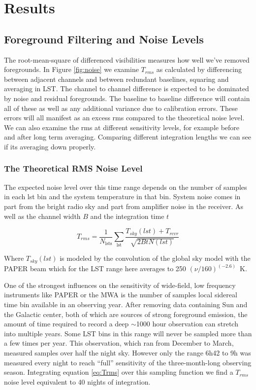 \documentclass[preprint2]{aastex}
\begin{document}
\section{Results}
\label{sec:results}
\subsection{Foreground Filtering and Noise Levels}
\label{sec:noise}
The root-mean-square of differenced visibilities measures how well we've removed foregrounds.  In Figure \ref{fig:noise} we examine $T_{rms}$ as calculated by differencing between adjacent channels and between redundant baselines, squaring and averaging in LST.  The channel to channel difference is expected to be dominated by noise and residual foregrounds. The baseline to baseline difference will contain all of these as well as any additional variance due to calibration errors.  These errors will all manifest as an excess rms compared to the theoretical noise level. We can also examine the rms at different sensitivity levels, for example before and after long term averaging. Comparing different integration lengths we can see if its averaging down properly.




\subsubsection{The Theoretical RMS Noise Level}

The expected noise level over this time range depends on the number of samples in each lst bin and the system temperature in that bin. System noise comes in part from the bright radio sky and part from amplifier noise in the receiver. As well as the channel width $B$ and the integration time $t$

\begin{equation}
T_{rms}  =\frac{1}{N_{\textrm{lsts}}}\sum_{\textrm{lst}} \frac{T_{sky}(lst) + T_{rcvr}}{\sqrt{2BtN(lst)}} 
\label{eq:Trms}
\end{equation}

Where $T_{sky}(lst)$ is modeled by the convolution of the global sky model \citep{deOliveiraCosta:2008p2242} with the PAPER beam \citep{Pober:2012p8800} which for the LST range here averages to 250 $(\nu/160)^(-2.6)$~K.



One of the strongest influences on the sensitivity of wide-field, low frequency instruments like PAPER or the MWA is the number of samples local sidereal time bin available in an observing year.   After removing data containing Sun and the Galactic center, both of which are sources of strong foreground emission, the amount of time required to record a deep $\sim$1000 hour observation can stretch into multiple years.  Some LST bins in this range will never be sampled more than a few times per year.  This observation, which ran from December to March, measured samples over half the night sky. However only the range 6h42 to 9h was measured every night to reach ``full'' sensitivity of the three-month-long observing season.  Integrating equation \ref{eq:Trms} over this sampling function we find a $T_{rms}$ noise level equivalent to 40 nights of integration. 
\end{document}
